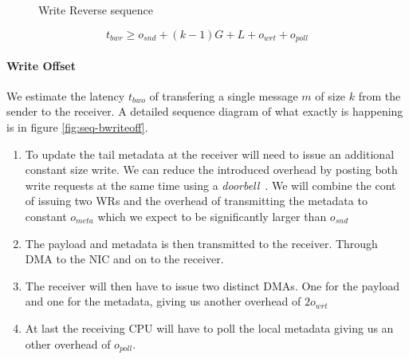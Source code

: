 \begin{figure}[!ht]
\begin{center}
\end{center}
\caption{Write Reverse sequence}
\label{fig:seq-bwriterev}
\end{figure}


$$
t_{bwr} \geq o_{snd} + (k-1)G + L + o_{wrt} + o_{poll}
$$

\paragraph{Write Offset}

We estimate the latency $t_{bwo}$ of transfering a single message $m$ of size $k$ from the sender to the receiver. 
A detailed sequence diagram of what exactly is happening is in figure \ref{fig:seq-bwriteoff}. 

\begin{enumerate}
  \item To update the tail metadata at the receiver will need to issue an additional constant size write. We can reduce the 
    introduced overhead by posting both write requests at the same time using a \emph{doorbell}~\cite{}. We will combine the
    cont of issuing two WRs and the overhead of transmitting the metadata to constant $o_{meta}$ which we expect to be 
    significantly larger than $o_{snd}$
  \item The payload and metadata is then transmitted to the receiver. Through DMA to the NIC and on to the receiver.
  \item The receiver will then have to issue two distinct DMAs. One for the payload and one for the metadata, giving us another
    overhead of $2o_{wrt}$
  \item At last the receiving CPU will have to poll the local metadata giving us an other overhead of $o_{poll}$.
\end{enumerate}


